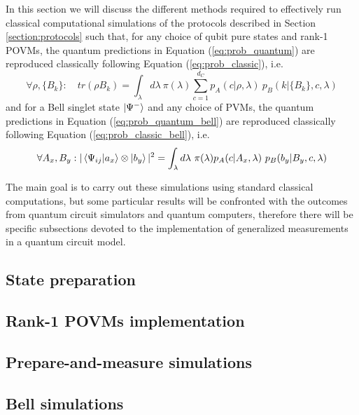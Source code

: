 In this section we will discuss the different methods required to effectively run classical computational simulations of the protocols described in Section \ref{section:protocols} such that, for any choice of qubit pure states and rank-1 POVMs, the quantum predictions in Equation (\ref{eq:prob_quantum}) are reproduced classically following Equation (\ref{eq:prob_classic}), i.e.
\begin{equation}
\forall \rho, \{B_{k}\}:\quad tr(\rho B_{k}) = \int_{\lambda} d\lambda\ \pi(\lambda) \sum_{c=1}^{d_C} p_A(c|\rho, \lambda)\ p_B(k|\{B_{k}\}, c, \lambda)    
\end{equation}
and for a Bell singlet state $\ket{\Psi^{-}}$ and any choice of PVMs, the quantum predictions in Equation (\ref{eq:prob_quantum_bell}) are reproduced classically following Equation (\ref{eq:prob_classic_bell}), i.e.
\begin{equation}
\forall A_{x}, B_{y}: |\bra{\Psi_{ij}}\ket{a_{x}} \otimes \ket{b_{y}}|^{2} = \int_{\lambda} d\lambda\ \pi(\lambda) p_A(c|A_{x}, \lambda)\ p_B(b_{y}|B_{y}, c, \lambda)
\end{equation}


The main goal is to carry out these simulations using standard classical computations, but some particular results will be confronted with the outcomes from quantum circuit simulators and quantum computers, therefore there will be specific subsections devoted to the implementation of generalized measurements in a quantum circuit model. 
\subsection{State preparation}

\subsection{Rank-1 POVMs implementation}

\subsection{Prepare-and-measure simulations}

\subsection{Bell simulations}\label{section:methods_bell}
